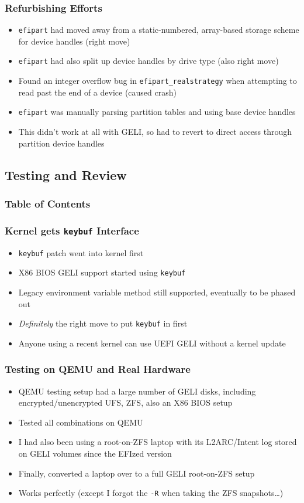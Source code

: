 \documentclass{beamer}
\begin{document}
\begin{frame}
  \frametitle{Refurbishing Efforts}
  \begin{itemize}
  \item \texttt{efipart} had moved away from a static-numbered,
    array-based storage scheme for device handles (right move)
  \item \texttt{efipart} had also split up device handles by drive
    type (also right move)
  \item Found an integer overflow bug in
    \texttt{efipart\_realstrategy} when attempting to read past the
    end of a device (caused crash)
  \item \texttt{efipart} was manually parsing partition tables and
    using base device handles
  \item This didn't work at all with GELI, so had to revert to direct
    access through partition device handles
  \end{itemize}
\end{frame}

\subsection{Testing and Review}

\begin{frame}
  \frametitle{Table of Contents}
  \tableofcontents[currentsection]
\end{frame}

\begin{frame}
  \frametitle{Kernel gets \texttt{keybuf} Interface}
  \begin{itemize}
  \item \texttt{keybuf} patch went into kernel first
  \item X86 BIOS GELI support started using \texttt{keybuf}
  \item Legacy environment variable method still supported, eventually
    to be phased out
  \item \emph{Definitely} the right move to put \texttt{keybuf} in first
  \item Anyone using a recent kernel can use UEFI GELI without a
    kernel update
  \end{itemize}
\end{frame}

\begin{frame}
  \frametitle{Testing on QEMU and Real Hardware}
  \begin{itemize}
  \item QEMU testing setup had a large number of GELI disks, including
    encrypted/unencrypted UFS, ZFS, also an X86 BIOS setup
  \item Tested all combinations on QEMU
  \item I had also been using a root-on-ZFS laptop with its
    L2ARC/Intent log stored on GELI volumes since the EFIzed version
  \item Finally, converted a laptop over to a full GELI root-on-ZFS setup
  \item Works perfectly (except I forgot the \texttt{-R} when taking
    the ZFS snapshots\ldots)
  \end{itemize}
\end{frame}
\end{document}
